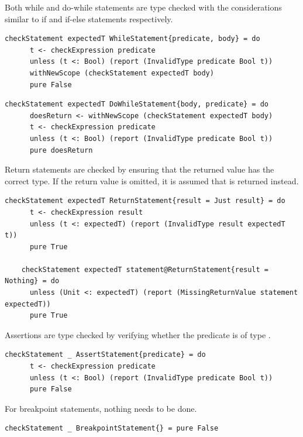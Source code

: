 \documentclass[UdineBachThesis,american,11pt]{PhdThesis}
\begin{document}
  Both while and do-while statements are type checked with the considerations
  similar to if and if-else statements respectively.

  \begin{lstlisting}[gobble=4,basicstyle=\ttfamily\small]
    checkStatement expectedT WhileStatement{predicate, body} = do
      t <- checkExpression predicate
      unless (t <: Bool) (report (InvalidType predicate Bool t))
      withNewScope (checkStatement expectedT body)
      pure False
  \end{lstlisting}

  \newpage

  \begin{lstlisting}[gobble=4,basicstyle=\ttfamily\small]
    checkStatement expectedT DoWhileStatement{body, predicate} = do
      doesReturn <- withNewScope (checkStatement expectedT body)
      t <- checkExpression predicate
      unless (t <: Bool) (report (InvalidType predicate Bool t))
      pure doesReturn
  \end{lstlisting}

  Return statements are checked by ensuring that the returned value has the
  correct type. If the return value is omitted, it is assumed that
  \lstinline@unit@ is returned instead.

  \begin{lstlisting}[gobble=4,basicstyle=\ttfamily\small]
    checkStatement expectedT ReturnStatement{result = Just result} = do
      t <- checkExpression result
      unless (t <: expectedT) (report (InvalidType result expectedT t))
      pure True

    checkStatement expectedT statement@ReturnStatement{result = Nothing} = do
      unless (Unit <: expectedT) (report (MissingReturnValue statement expectedT))
      pure True
  \end{lstlisting}

  Assertions are type checked by verifying whether the predicate is of type
  \lstinline@Bool@.

  \begin{lstlisting}[gobble=4,basicstyle=\ttfamily\small]
    checkStatement _ AssertStatement{predicate} = do
      t <- checkExpression predicate
      unless (t <: Bool) (report (InvalidType predicate Bool t))
      pure False
  \end{lstlisting}

  For breakpoint statements, nothing needs to be done.

  \begin{lstlisting}[gobble=4,basicstyle=\ttfamily\small]
    checkStatement _ BreakpointStatement{} = pure False
  \end{lstlisting}
\end{document}
